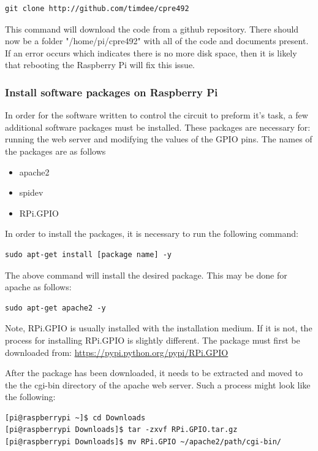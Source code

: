 \documentclass{article}	%
\begin{document}
\begin{multicols}{2}
\begin{lstlisting}
git clone http://github.com/timdee/cpre492
\end{lstlisting}

This command will download the code from
a github repository.
There should now be a folder "/home/pi/cpre492" with
all of the code and documents present.
If an error occurs which indicates there is no more disk space,
then it is likely that rebooting the Raspberry Pi will fix this issue.

\subsubsection{Install software packages on Raspberry Pi}
In order for the software written to
control the circuit to preform it's task,
a few additional software packages must be installed.
These packages are necessary for:
running the web server
and modifying the values of the GPIO pins.
The names of the packages are as follows

\begin{itemize}
\item apache2
\item spidev
\item RPi.GPIO
\end{itemize}

In order to install the packages,
it is necessary to run the following command:

\begin{lstlisting}
sudo apt-get install [package name] -y
\end{lstlisting}

The above command will install the desired package.
This may be done for apache as follows:

\begin{lstlisting}
sudo apt-get apache2 -y
\end{lstlisting}

Note, RPi.GPIO is usually installed with the installation
medium.
If it is not,
the process for installing RPi.GPIO is slightly different.
The package must first be downloaded from:
\url{https://pypi.python.org/pypi/RPi.GPIO}

After the package has been downloaded,
it needs to be extracted and moved to the
the cgi-bin directory of the apache web server.
Such a process might look like the following:

\begin{lstlisting}
[pi@raspberrypi ~]$ cd Downloads
[pi@raspberrypi Downloads]$ tar -zxvf RPi.GPIO.tar.gz
[pi@raspberrypi Downloads]$ mv RPi.GPIO ~/apache2/path/cgi-bin/
\end{lstlisting}


\end{multicols}
\end{document}
